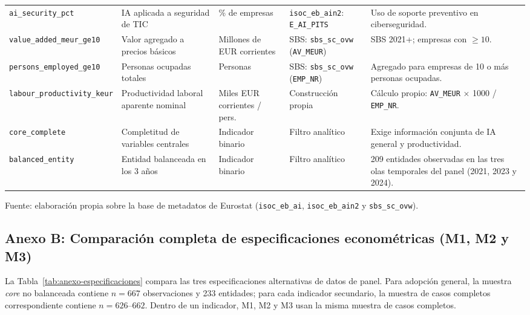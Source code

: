 \documentclass[12pt,a4paper]{article}
\begin{document}
\begin{tabularx}{\textwidth}{lXllX}
\texttt{ai\_security\_pct} & IA aplicada a seguridad de TIC & \% de empresas & \texttt{isoc\_eb\_ain2}: \texttt{E\_AI\_PITS} & Uso de soporte preventivo en ciberseguridad. \\
\texttt{value\_added\_meur\_ge10} & Valor agregado a precios básicos & Millones de EUR corrientes & SBS: \texttt{sbs\_sc\_ovw} (\texttt{AV\_MEUR}) & SBS 2021+; empresas con $\geq 10$. \\
\texttt{persons\_employed\_ge10} & Personas ocupadas totales & Personas & SBS: \texttt{sbs\_sc\_ovw} (\texttt{EMP\_NR}) & Agregado para empresas de 10 o más personas ocupadas. \\
\texttt{labour\_productivity\_keur} & Productividad laboral aparente nominal & Miles EUR corrientes / pers. & Construcción propia & Cálculo propio: \texttt{AV\_MEUR} $\times$ 1000 / \texttt{EMP\_NR}. \\
\texttt{core\_complete} & Completitud de variables centrales & Indicador binario & Filtro analítico & Exige información conjunta de IA general y productividad. \\
\texttt{balanced\_entity} & Entidad balanceada en los 3 años & Indicador binario & Filtro analítico & 209 entidades observadas en las tres olas temporales del panel (2021, 2023 y 2024). \\
\bottomrule
\end{tabularx}
\endgroup
\begin{flushleft}
\tiny Fuente: elaboración propia sobre la base de metadatos de Eurostat (\texttt{isoc\_eb\_ai}, \texttt{isoc\_eb\_ain2} y \texttt{sbs\_sc\_ovw}).
\end{flushleft}

\subsection*{Anexo B: Comparación completa de especificaciones econométricas (M1, M2 y M3)}

\label{anexo:especificaciones}

La Tabla~\ref{tab:anexo-especificaciones} compara las tres especificaciones alternativas de datos de panel. Para adopción general, la muestra \textit{core} no balanceada contiene $n=667$ observaciones y 233 entidades; para cada indicador secundario, la muestra de casos completos correspondiente contiene $n=626\text{--}662$. Dentro de un indicador, M1, M2 y M3 usan la misma muestra de casos completos.
\end{document}
